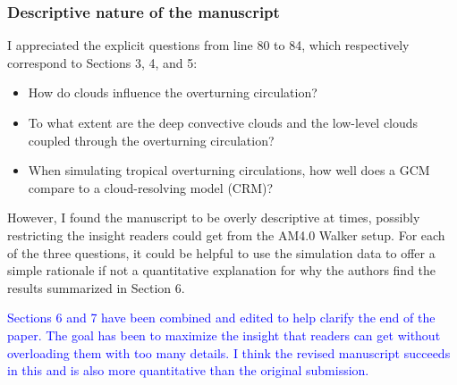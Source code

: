 \documentclass[draft]{agujournal2019}
\begin{document}
\subsubsection{Descriptive nature of the manuscript}

I appreciated the explicit questions from line 80 to 84, which respectively correspond to Sections 3, 4, and 5:

\begin{itemize}
  \item How do clouds influence the overturning circulation?
  \item To what extent are the deep convective clouds and the low-level clouds coupled through the overturning circulation?
  \item When simulating tropical overturning circulations, how well does a GCM compare to a cloud-resolving model (CRM)?
\end{itemize}

However, I found the manuscript to be overly descriptive at times, possibly restricting the insight readers could get from
the AM4.0 Walker setup. For each of the three questions, it could be helpful to use the simulation data to offer a simple
rationale if not a quantitative explanation for why the authors find the results summarized in Section 6.  

\textcolor{blue}{Sections 6 and 7 have been combined and edited to help clarify the end of the paper.  The goal has been to 
maximize the insight that readers can get without overloading them with too many details.  I think the revised manuscript 
succeeds in this and is also more quantitative than the original submission.}
\end{document}
